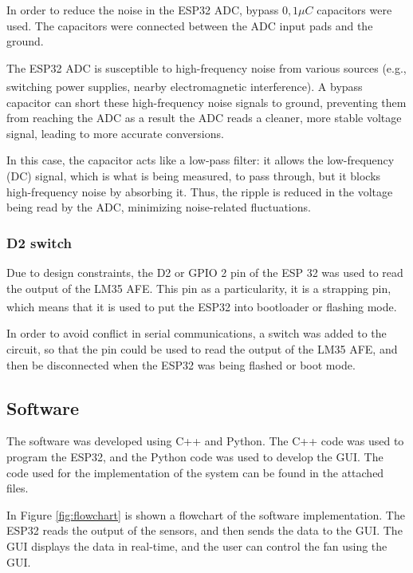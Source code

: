\documentclass[12pt]{article}
\begin{document}
In order to reduce the noise in the ESP32 ADC, bypass $0,1\mu C$ capacitors were used. The capacitors were connected between the ADC input pads and the ground.

The ESP32 ADC is susceptible to high-frequency noise from various sources (e.g., switching power supplies, nearby electromagnetic interference)\textsuperscript{\cite{ESP-IDF-Programming-Guide}}. A bypass capacitor can short these high-frequency noise signals to ground, preventing them from reaching the ADC as a result the ADC reads a cleaner, more stable voltage signal, leading to more accurate conversions.

In this case, the capacitor acts like a low-pass filter: it allows the low-frequency (DC) signal, which is what is being measured, to pass through, but it blocks high-frequency noise by absorbing it. Thus, the ripple is reduced in the voltage being read by the ADC, minimizing noise-related fluctuations.

\subsubsection{D2 switch}
Due to design constraints, the D2 or GPIO 2 pin of the ESP 32 was used to read the output of the LM35 AFE. This pin as a particularity, it is a strapping pin, which means that it is used to put the ESP32 into bootloader or flashing mode\textsuperscript{\cite{ESP-IDF-Programming-Guide}}.

In order to avoid conflict in serial communications, a switch was added to the circuit, so that the pin could be used to read the output of the LM35 AFE, and then be disconnected when the ESP32 was being flashed or boot mode. 

\subsection{Software}
The software was developed using C++ and Python. The C++ code was used to program the ESP32, and the Python code was used to develop the GUI. The code used for the implementation of the system can be found in the attached files.

In Figure \ref{fig:flowchart} is shown a flowchart of the software implementation. The ESP32 reads the output of the sensors, and then sends the data to the GUI. The GUI displays the data in real-time, and the user can control the fan using the GUI.
\end{document}
